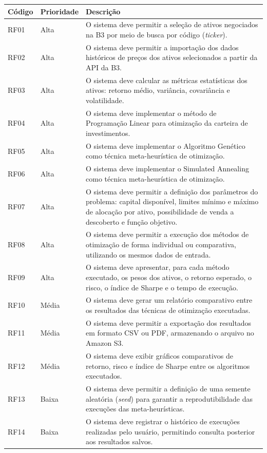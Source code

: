 \documentclass[
	12pt,				%
	openright,			%
	oneside,			    %
	a4paper,				%
	english,			%
	french,			%
	spanish,			%
	brazil			%
	]{abntex2}
\begin{document}
\begin{quadro}[htb]
\caption{Requisitos funcionais do sistema — \textit{backlog} do produto}
\label{qua:requisitos-funcionais}
\begin{tabularx}{\textwidth}{|p{1.5cm}|p{1.8cm}|X|}
\hline
\rowcolor[HTML]{BDD7EE}
\textbf{Código} & \textbf{Prioridade} & \textbf{Descrição} \\ \hline
RF01 & Alta &
  O sistema deve permitir a seleção de ativos negociados na B3 por meio de busca por código (\textit{ticker}). \\ \hline
RF02 & Alta &
  O sistema deve permitir a importação dos dados históricos de preços dos ativos selecionados a partir da API da B3. \\ \hline
RF03 & Alta &
  O sistema deve calcular as métricas estatísticas dos ativos: retorno médio, variância, covariância e volatilidade. \\ \hline
RF04 & Alta &
  O sistema deve implementar o método de Programação Linear para otimização da carteira de investimentos. \\ \hline
RF05 & Alta &
  O sistema deve implementar o Algoritmo Genético como técnica meta-heurística de otimização. \\ \hline
RF06 & Alta &
  O sistema deve implementar o Simulated Annealing como técnica meta-heurística de otimização. \\ \hline
RF07 & Alta &
  O sistema deve permitir a definição dos parâmetros do problema: capital disponível, limites mínimo e máximo de alocação por ativo, possibilidade de venda a descoberto e função objetivo. \\ \hline
RF08 & Alta &
  O sistema deve permitir a execução dos métodos de otimização de forma individual ou comparativa, utilizando os mesmos dados de entrada. \\ \hline
RF09 & Alta &
  O sistema deve apresentar, para cada método executado, os pesos dos ativos, o retorno esperado, o risco, o índice de Sharpe e o tempo de execução. \\ \hline
RF10 & Média &
  O sistema deve gerar um relatório comparativo entre os resultados das técnicas de otimização executadas. \\ \hline
RF11 & Média &
  O sistema deve permitir a exportação dos resultados em formato CSV ou PDF, armazenando o arquivo no Amazon S3. \\ \hline
RF12 & Média &
  O sistema deve exibir gráficos comparativos de retorno, risco e índice de Sharpe entre os algoritmos executados. \\ \hline
RF13 & Baixa &
  O sistema deve permitir a definição de uma semente aleatória (\textit{seed}) para garantir a reprodutibilidade das execuções das meta-heurísticas. \\ \hline
RF14 & Baixa &
  O sistema deve registrar o histórico de execuções realizadas pelo usuário, permitindo consulta posterior aos resultados salvos. \\ \hline
\end{tabularx}
\end{quadro}
\end{document}
